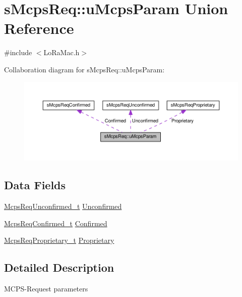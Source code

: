 \hypertarget{unionsMcpsReq_1_1uMcpsParam}{}\section{s\+Mcps\+Req\+:\+:u\+Mcps\+Param Union Reference}
\label{unionsMcpsReq_1_1uMcpsParam}


{\ttfamily \#include $<$Lo\+Ra\+Mac.\+h$>$}



Collaboration diagram for s\+Mcps\+Req\+:\+:u\+Mcps\+Param\+:
\nopagebreak
\begin{figure}[H]
\begin{center}
\leavevmode
\includegraphics[width=350pt]{unionsMcpsReq_1_1uMcpsParam__coll__graph}
\end{center}
\end{figure}
\subsection*{Data Fields}
\begin{DoxyCompactItemize}
\item 
\hyperlink{group__LORAMAC_gaab871b914dfa4013c176586dcc2ea6df}{Mcps\+Req\+Unconfirmed\+\_\+t} \hyperlink{unionsMcpsReq_1_1uMcpsParam_a2aae1e6bd0891c17e9bc2654ae95e60a}{Unconfirmed}
\item 
\hyperlink{group__LORAMAC_ga02103c0ee1374a6b1eec217f148ec0e2}{Mcps\+Req\+Confirmed\+\_\+t} \hyperlink{unionsMcpsReq_1_1uMcpsParam_a55f25abc41d07654f0ed8a92541a1eef}{Confirmed}
\item 
\hyperlink{group__LORAMAC_gac856bc282e89301412e0a294b3e663c4}{Mcps\+Req\+Proprietary\+\_\+t} \hyperlink{unionsMcpsReq_1_1uMcpsParam_a894cf87a04261fa298cde47fc50ac02d}{Proprietary}
\end{DoxyCompactItemize}


\subsection{Detailed Description}
M\+C\+P\+S-\/\+Request parameters 

